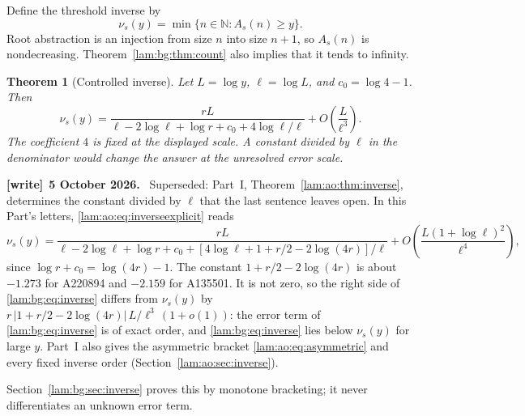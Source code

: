 \documentclass[11pt,a4paper]{article}
\numberwithin{equation}{section}
\newtheorem{theorem}{Theorem}[section]
\theoremstyle{remark}
\newcommand{\N}{\mathbb N}
\newenvironment{writenote}[1][]{\par\smallskip\begingroup\small
 \noindent\textbf{[write]}\if\relax\detokenize{#1}\relax\else~\textbf{#1.}\fi\ }%
 {\par\endgroup\smallskip}
\begin{document}
Define the threshold inverse by
\begin{equation}\label{lam:bg:eq:inverse-def}
 \nu_s(y)=\min\{n\in\N:A_s(n)\ge y\}.
\end{equation}
Root abstraction is an injection from size $n$ into size $n+1$, so $A_s(n)$ is nondecreasing. Theorem~\ref{lam:bg:thm:count} also implies that it tends to infinity.
\begin{theorem}[Controlled inverse]\label{lam:bg:thm:inverse}
Let $L=\log y$, $\ell=\log L$, and $c_0=\log4-1$. Then
\begin{equation}\label{lam:bg:eq:inverse}
 \nu_s(y)=
 \frac{rL}{\ell-2\log\ell+\log r+c_0+4\log\ell/\ell}
       +O\!\left(\frac L{\ell^3}\right).
\end{equation}
The coefficient $4$ is fixed at the displayed scale. A constant divided by $\ell$ in the denominator would change the answer at the unresolved error scale.
\end{theorem}
\begin{writenote}[5 October 2026]
Superseded: Part~I, Theorem~\ref{lam:ao:thm:inverse}, determines the constant divided by $\ell$ that the last sentence leaves open. In this Part's letters, \eqref{lam:ao:eq:inverseexplicit} reads
\[
 \nu_s(y)=\frac{rL}{\ell-2\log\ell+\log r+c_0+[4\log\ell+1+r/2-2\log(4r)]/\ell}+O\!\left(\frac{L(1+\log\ell)^2}{\ell^4}\right),
\]
since $\log r+c_0=\log(4r)-1$. The constant $1+r/2-2\log(4r)$ is about $-1.273$ for A220894 and $-2.159$ for A135501. It is not zero, so the right side of \eqref{lam:bg:eq:inverse} differs from $\nu_s(y)$ by $r\,|1+r/2-2\log(4r)|\,L/\ell^3\,(1+o(1))$: the error term of \eqref{lam:bg:eq:inverse} is of exact order, and \eqref{lam:bg:eq:inverse} lies below $\nu_s(y)$ for large $y$. Part~I also gives the asymmetric bracket \eqref{lam:ao:eq:asymmetric} and every fixed inverse order (Section~\ref{lam:ao:sec:inverse}).
\end{writenote}
Section~\ref{lam:bg:sec:inverse} proves this by monotone bracketing; it never differentiates an unknown error term.
\end{document}
